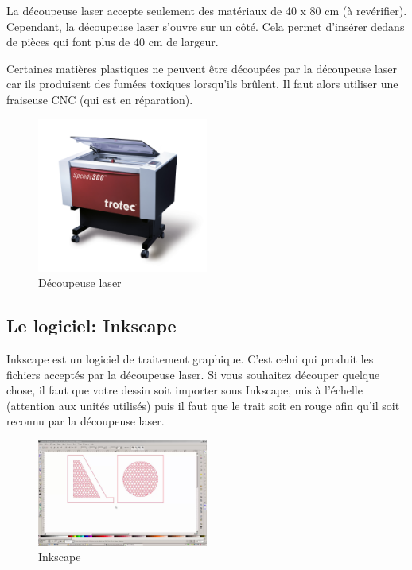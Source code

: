 \documentclass[a4paper, 11pt]{report}
\begin{document}
La découpeuse laser accepte seulement des matériaux de 40 x 80 cm (à revérifier). Cependant, la découpeuse laser s'ouvre sur un côté. Cela permet d'insérer dedans de pièces qui font plus de 40 cm de largeur.

Certaines matières plastiques ne peuvent être découpées par la découpeuse laser car ils produisent des fumées toxiques lorsqu'ils brûlent. Il faut alors utiliser une fraiseuse CNC (qui est en réparation).

\begin{figure}[h!]
	\begin{center}
		\includegraphics[width=0.5\textwidth]{images/decoupeuse_laser.jpg}
		\caption{Découpeuse laser}
	\end{center}
\end{figure}

\subsection{Le logiciel: Inkscape}
Inkscape est un logiciel de traitement graphique. C'est celui qui produit les fichiers acceptés par la découpeuse laser. Si vous souhaitez découper quelque chose, il faut que votre dessin soit importer sous Inkscape, mis à l'échelle (attention aux unités utilisés) puis il faut que le trait soit en rouge afin qu'il soit reconnu par la découpeuse laser.

\begin{figure}[h!]
	\begin{center}
		\includegraphics[width=0.5\textwidth]{images/inkscape.jpg}
		\caption{Inkscape}
	\end{center}
\end{figure}
\end{document}
